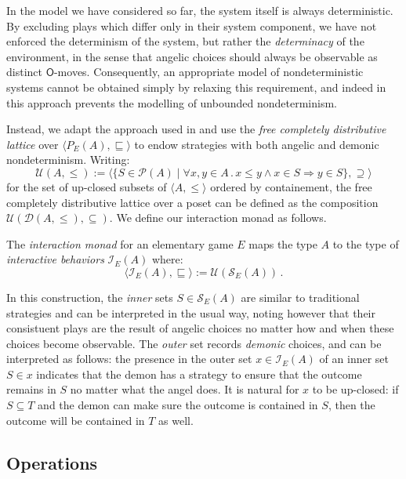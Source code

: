 \documentclass[format=sigplan,authordraft]{acmart}
\newcommand{\kw}[1]{\ensuremath{\mathsf{#1}}}
\begin{document}
In the model we have considered so far,
the system itself is always deterministic.
By excluding plays which differ only in their system component,
we have not enforced the determinism of the system,
but rather the \emph{determinacy} of the environment,
in the sense that angelic choices should always be observable
as distinct \kw{O}-moves.
Consequently,
an appropriate model of nondeterministic systems
cannot be obtained simply by relaxing this requirement,
and indeed in \cite{gsfnd} this approach
prevents the modelling of unbounded nondeterminism.

Instead,
we adapt the approach used in \cite{augtyp}
and use the \emph{free completely distributive lattice}
over $\langle P_E(A), {\sqsubseteq} \rangle$
to endow strategies with both angelic and demonic nondeterminism.
Writing:
\[
  \mathcal{U}(A, {\le}) :=
    \langle
    \{ S \in \mathcal{P}(A) \mid
        \forall x, y \in A \,.\,
           x \le y \wedge x \in S \Rightarrow y \in S \},
    {\supseteq}
    \rangle
\]
for the set of up-closed subsets of $\langle A, {\le} \rangle$
ordered by containement,
the free completely distributive lattice over a poset
can be defined as the composition
$\mathcal{U}(\mathcal{D}(A, {\le}), {\subseteq})$.
We define our interaction monad as follows.

\begin{definition}
The \emph{interaction monad}
for an elementary game $E$
maps the type $A$ to the type of \emph{interactive behaviors}
$\mathcal{I}_E(A)$ where:
\[
  \langle \mathcal{I}_E(A), {\sqsubseteq} \rangle :=
    \mathcal{U}(\mathcal{S}_E(A)) \,.
\]
\end{definition}

In this construction,
the \emph{inner} sets $S \in \mathcal{S}_E(A)$
are similar to traditional strategies and
can be interpreted in the usual way,
noting however that their consistuent plays
are the result of angelic choices
no matter how and when these choices become observable.
The \emph{outer} set records \emph{demonic} choices,
and can be interpreted as follows:
the presence in the outer set $x \in \mathcal{I}_E(A)$
of an inner set $S \in x$
indicates that the demon has a strategy
to ensure that the outcome remains in $S$
no matter what the angel does.
It is natural for $x$ to be up-closed:
if $S \subseteq T$ and the demon can make sure
the outcome is contained in $S$,
then the outcome will be contained in $T$ as well.

\subsection{Operations}
\end{document}
